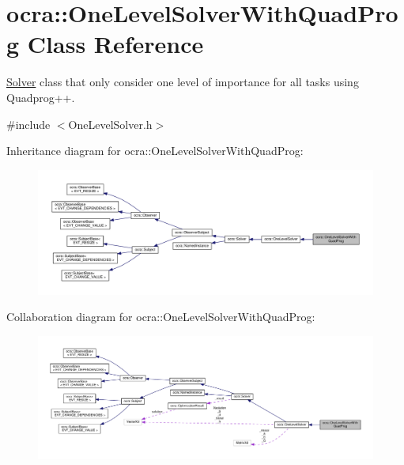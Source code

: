 \hypertarget{classocra_1_1OneLevelSolverWithQuadProg}{}\section{ocra\+:\+:One\+Level\+Solver\+With\+Quad\+Prog Class Reference}
\label{classocra_1_1OneLevelSolverWithQuadProg}


\hyperlink{classocra_1_1Solver}{Solver} class that only consider one level of importance for all tasks using Quadprog++.  




{\ttfamily \#include $<$One\+Level\+Solver.\+h$>$}



Inheritance diagram for ocra\+:\+:One\+Level\+Solver\+With\+Quad\+Prog\+:
\nopagebreak
\begin{figure}[H]
\begin{center}
\leavevmode
\includegraphics[width=350pt]{db/d00/classocra_1_1OneLevelSolverWithQuadProg__inherit__graph}
\end{center}
\end{figure}


Collaboration diagram for ocra\+:\+:One\+Level\+Solver\+With\+Quad\+Prog\+:
\nopagebreak
\begin{figure}[H]
\begin{center}
\leavevmode
\includegraphics[width=350pt]{da/dc6/classocra_1_1OneLevelSolverWithQuadProg__coll__graph}
\end{center}
\end{figure}
